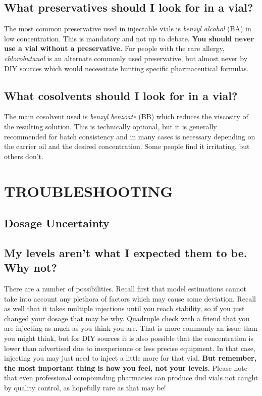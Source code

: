 \documentclass{article}
\begin{document}
\subsection{What preservatives should I look for in a vial?}\label{6-17}

The most common preservative used in injectable vials is \textit{benzyl alcohol} (BA) in low concentration. This is mandatory and not up to debate. \textbf{You should never use a vial without a preservative. }For people with the rare allergy, \textit{chlorobutanol }is an alternate commonly used preservative, but almost never by DIY sources which would necessitate hunting specific pharmaceutical formulas.

\subsection{What cosolvents should I look for in a vial?}

The main cosolvent used is \textit{benzyl benzoate} (BB) which reduces the viscosity of the resulting solution. This is technically optional, but it is generally recommended for batch consistency and in many cases is necessary depending on the carrier oil and the desired concentration. Some people find it irritating, but others don’t. 

 

\section{TROUBLESHOOTING}

\subsection*{Dosage Uncertainty}

\subsection{My levels aren’t what I expected them to be. Why not?}

There are a number of possibilities. Recall first that model estimations cannot take into account any plethora of factors which may cause some deviation. Recall as well that it takes multiple injections until you reach stability, so if you just changed your dosage that may be why. Quadruple check with a friend that you are injecting as much as you think you are. That is more commonly an issue than you might think, but for DIY sources it is also possible that the concentration is lower than advertised due to inexperience or less precise equipment. In that case, injecting you may just need to inject a little more for that vial. \textbf{But remember, the most important thing is how you feel, not your levels. }Please note that even professional compounding pharmacies can produce dud vials not caught by quality control, as hopefully rare as that may be!
\end{document}
